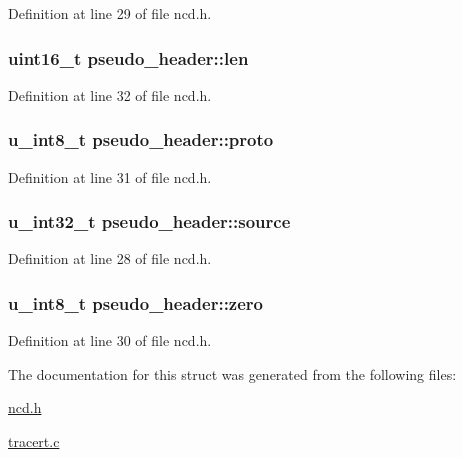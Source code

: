 Definition at line 29 of file ncd.\-h.

\hypertarget{structpseudo__header_a436e199ba010989dff88ba26ee6de668}{
\subsubsection[{len}]{\setlength{\rightskip}{0pt plus 5cm}uint16\-\_\-t pseudo\-\_\-header\-::len}}\label{structpseudo__header_a436e199ba010989dff88ba26ee6de668}


Definition at line 32 of file ncd.\-h.

\hypertarget{structpseudo__header_acdb79cab7f361df75fe519e43e1db18c}{
\subsubsection[{proto}]{\setlength{\rightskip}{0pt plus 5cm}u\-\_\-int8\-\_\-t pseudo\-\_\-header\-::proto}}\label{structpseudo__header_acdb79cab7f361df75fe519e43e1db18c}


Definition at line 31 of file ncd.\-h.

\hypertarget{structpseudo__header_ac1d63e2b666037057fba16b852c83549}{
\subsubsection[{source}]{\setlength{\rightskip}{0pt plus 5cm}u\-\_\-int32\-\_\-t pseudo\-\_\-header\-::source}}\label{structpseudo__header_ac1d63e2b666037057fba16b852c83549}


Definition at line 28 of file ncd.\-h.

\hypertarget{structpseudo__header_a2a93c892eaf942dfb5c28a69c88f0ad7}{
\subsubsection[{zero}]{\setlength{\rightskip}{0pt plus 5cm}u\-\_\-int8\-\_\-t pseudo\-\_\-header\-::zero}}\label{structpseudo__header_a2a93c892eaf942dfb5c28a69c88f0ad7}


Definition at line 30 of file ncd.\-h.



The documentation for this struct was generated from the following files\-:\begin{DoxyCompactItemize}
\item 
\hyperlink{ncd_8h}{ncd.\-h}\item 
\hyperlink{tracert_8c}{tracert.\-c}\end{DoxyCompactItemize}

